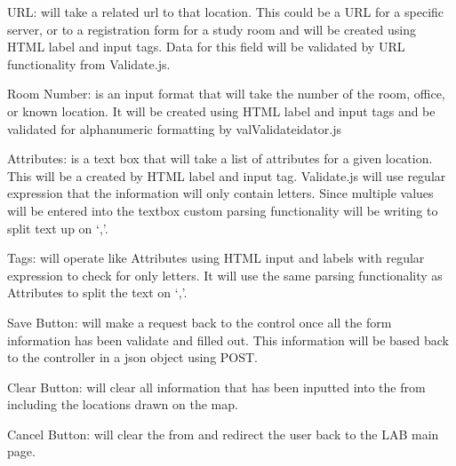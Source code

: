 \documentclass[letterpaper,10pt,titlepage, onecolumn, compsoc]{IEEEtran}
\begin{document}
URL: will take a related url to that location. This could be a URL for a specific server, or to a registration form for a study room and will be created using HTML label and input tags. Data for this field will be validated by URL functionality from Validate.js.

Room Number: is an input format that will take the number of the room, office, or known location. It will be created using HTML label and input tags and be validated for alphanumeric formatting by valValidateidator.js

Attributes: is a text box that will take a list of attributes for a given location. This will be a created by HTML label and input tag. Validate.js will use regular expression that the information will only contain letters. Since multiple values will be entered into the textbox custom parsing functionality will be writing to split text up on ‘,’.

Tags: will operate like Attributes using HTML input and labels with regular expression to check for only letters. It will use the same parsing functionality as Attributes to split the text on ‘,’.

Save Button: will make a request back to the control once all the form information has been validate and filled out. This information will be based back to the controller in a json object using POST.

Clear Button: will clear all information that has been inputted into the from including the locations drawn on the map.

Cancel Button: will clear the from and redirect the user back to the LAB main page.
\end{document}
